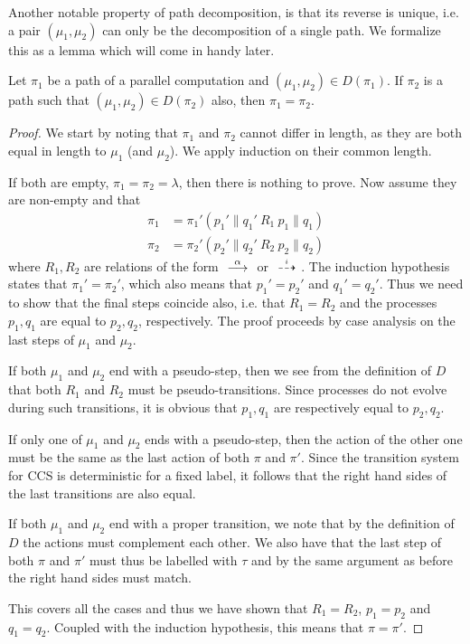 Another notable property of path decomposition, is that its reverse is unique, i.e.
a pair $(\mu_1,\mu_2)$ can only be the decomposition of a single path. We formalize
this as a lemma which will come in handy later.
\begin{lemma}\label{thm:paths_compose_uniquely}
    Let $\pi_1$ be a path of a parallel computation and $(\mu_1,\mu_2)\in D(\pi_1)$. 
    If $\pi_2$ is a path such
    that $(\mu_1,\mu_2)\in D(\pi_2)$ also, then $\pi_1=\pi_2$.
\end{lemma}
\begin{proof}
    We start by noting that $\pi_1$ and $\pi_2$ cannot differ in length, as they
    are both equal in length to $\mu_1$ (and $\mu_2$). We apply induction on
    their common length.

    If both are empty, $\pi_1=\pi_2=\lambda$, then there is nothing to prove.
    Now assume they are non-empty and that
    \begin{align*}
        \pi_1 &= \pi_1' (p_1' \parallel q_1' \ R_1\  p_1 \parallel q_1) \\
        \pi_2 &= \pi_2' (p_2' \parallel q_2' \ R_2\  p_2 \parallel q_2)
    \end{align*}
    where $R_1,R_2$ are relations of the form $\ {\stackrel{{\alpha}}{\longrightarrow}}\ $ or $\ {\stackrel{_{i}}{\dashrightarrow}}\ $.
    The induction hypothesis states that $\pi_1' = \pi_2'$, which also means
    that $p_1'=p_2'$ and $q_1'=q_2'$. Thus we need to show
    that the final steps coincide also, i.e. that $R_1=R_2$ and the processes
    $p_1, q_1$ are equal to $p_2,q_2$, respectively.
    The proof proceeds by case analysis on the last steps of $\mu_1$ and $\mu_2$.

    If both $\mu_1$ and $\mu_2$ end with a pseudo-step, then we see from the definition
    of $D$ that both $R_1$ and $R_2$ must be pseudo-transitions. Since processes do
    not evolve during such transitions, it is obvious that $p_1,q_1$ are respectively
    equal to $p_2,q_2$.

    If only one of $\mu_1$ and $\mu_2$ ends with a pseudo-step, then the action
    of the other one must be the same as the last action of both $\pi$ and $\pi'$.
    Since the transition system for CCS is deterministic for a fixed label, it
    follows that the right hand sides of the last transitions are also equal.

    If both $\mu_1$ and $\mu_2$ end with a proper transition, we note that by
    the definition of $D$ the actions must complement each other. We also have
    that the last step of both $\pi$ and $\pi'$ must thus be labelled with $\tau$
    and by the same argument as before the right hand sides must match.

    This covers all the cases and thus we have shown that $R_1=R_2$, $p_1=p_2$
    and $q_1=q_2$. Coupled with the induction hypothesis, this means that $\pi=\pi'$.
\end{proof}

